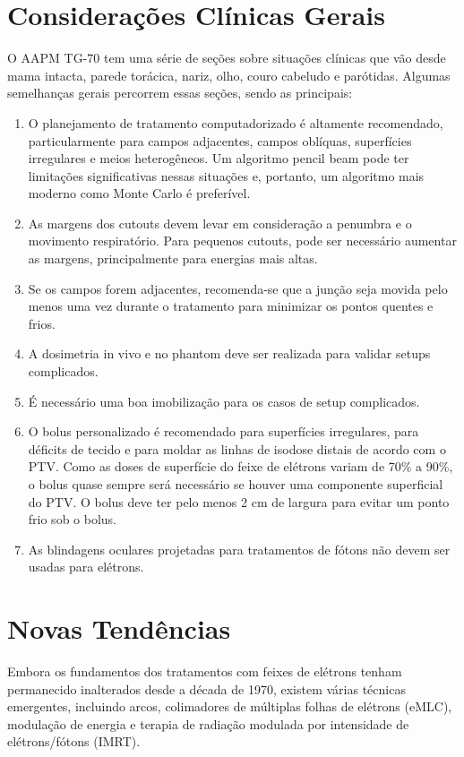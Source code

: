 \documentclass[11pt,a4paper]{article}
\begin{document}
\section{Considerações Clínicas Gerais}

	O AAPM TG-70 tem uma série de seções sobre situações clínicas que vão desde mama intacta, parede torácica, nariz, olho, couro cabeludo e parótidas. Algumas semelhanças gerais percorrem essas seções, sendo as principais:

	\begin{enumerate}[label=\textcolor{CarnationPink}{(\roman*)}]
		\item O planejamento de tratamento computadorizado é altamente recomendado, particularmente para campos adjacentes, campos oblíquas, superfícies irregulares e meios heterogêneos. Um algoritmo pencil beam pode ter limitações significativas nessas situações e, portanto, um algoritmo mais moderno como Monte Carlo é preferível.
		\item As margens dos cutouts devem levar em consideração a penumbra e o movimento respiratório. Para pequenos cutouts, pode ser necessário aumentar as margens, principalmente para energias mais altas.
		\item Se os campos forem adjacentes, recomenda-se que a junção seja movida pelo menos uma vez durante o tratamento para minimizar os pontos quentes e frios.
		\item A dosimetria in vivo e no phantom deve ser realizada para validar setups complicados.
		\item É necessário uma boa imobilização para os casos de setup complicados.
		\item O bolus personalizado é recomendado para superfícies irregulares, para déficits de tecido e para moldar as linhas de isodose distais de acordo com o PTV. Como as doses de superfície do feixe de elétrons variam de 70\% a 90\%, o bolus quase sempre será necessário se houver uma componente superficial do PTV. O bolus deve ter pelo menos 2 cm de largura para evitar um ponto frio sob o bolus.
		\item As blindagens oculares projetadas para tratamentos de fótons não devem ser usadas para elétrons.
	\end{enumerate}

\section{Novas Tendências}

	Embora os fundamentos dos tratamentos com feixes de elétrons tenham permanecido inalterados desde a década de 1970, existem várias técnicas emergentes, incluindo arcos, colimadores de múltiplas folhas de elétrons (eMLC), modulação de energia e terapia de radiação modulada por intensidade de elétrons/fótons (IMRT).
\end{document}
